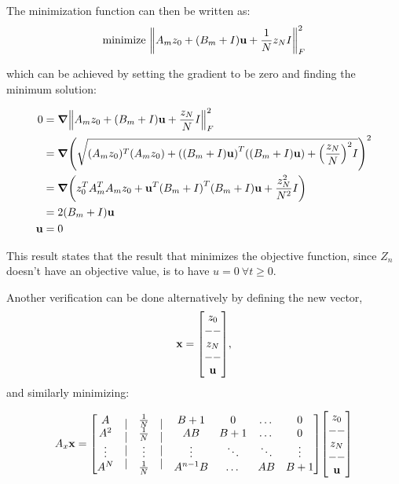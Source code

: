 \documentclass[letter]{article}
\begin{document}
The minimization function can then be written as:
\begin{align*}
	\text{minimize} \ \norm{A_m z_0 + \qty(B_m + I) \vb{u} + \frac{1}{N} z_N I}_F^2
\end{align*}

which can be achieved by setting the gradient to be zero and finding the minimum solution:

\begin{align*}
	0
	&= \grad{\norm{A_m z_0 + \qty(B_m + I) \vb{u} + \frac{z_N}{N}  I}_F^2}\\
	&= \grad{\qty(\sqrt{(A_m z_0)^T(A_m z_0) + \qty(\qty(B_m + I) \vb{u})^T \qty(\qty(B_m + I) \vb{u}) + \qty(\frac{z_N}{N})^2 I})^2}\\
	&= \grad{\qty(z_0^T A_m^T A_m z_0 + \vb{u}^T\qty(B_m + I)^T\qty(B_m + I) \vb{u} + \frac{z_N^2}{N^2} I)}\\
	&= 2 (B_m + I) \vb{u}\\
	\vb{u} &= 0
\end{align*}

This result states that the result that minimizes the objective function, since $Z_n$ doesn't have an objective value, is to have $u = 0 \ \forall t \geq 0$.

Another verification can be done alternatively by defining the new vector, $$\vb{x} = \mqty[z_0\\ --\\z_N\\ --\\ \vb{u}],$$ and similarly minimizing:

\begin{align*}
		A_x \vb{x}
		&= \mqty[\mqty{A \\ A^2 \\ \vdots \\ A^N} 
				& \mqty{|\\|\\|\\|} 
				& \mqty{\frac{1}{N} \\ \frac{1}{N} \\ \vdots \\ \frac{1}{N}}
				& \mqty{|\\|\\|\\|}
				& \mqty{B + 1 	& 0 & \dots & 0\\
						AB 	& B + 1 & \dots & 0\\
						\vdots & \ddots &\ddots &\vdots\\
						A^{n-1}B &\dots &AB &B + 1}]
			\mqty[z_0\\ --\\z_N\\ --\\ \vb{u}]\\
\end{align*}
\end{document}
